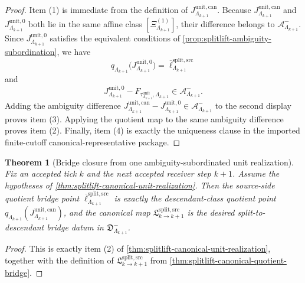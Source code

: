 \documentclass[11pt]{article}
\theoremstyle{definition}
\theoremstyle{plain}
\newtheorem{theorem}[definition]{Theorem}
\theoremstyle{remark}
\newcommand{\1}{\mathbf 1}
\begin{document}
\begin{proof}
Item \textnormal{(1)} is immediate from the definition of
\(
J^{\mathrm{unit,can}}_{\Lambda_{k+1}}
\).
Because
\(
J^{\mathrm{unit,can}}_{\Lambda_{k+1}}
\)
and
\(
J^{\mathrm{unit},0}_{\Lambda_{k+1}}
\)
both lie in the same affine class
\(
[\Xi^{(1)}_{\Lambda_{k+1}}]
\),
their difference belongs to
\(
\mathcal A^-_{\Lambda_{k+1}}
\).
Since
\(
J^{\mathrm{unit},0}_{\Lambda_{k+1}}
\)
satisfies the equivalent conditions of \cref{prop:splitlift-ambiguity-subordination}, we have
\[
q_{\Lambda_{k+1}}
\!\bigl(
J^{\mathrm{unit},0}_{\Lambda_{k+1}}
\bigr)
=
\overline\ell^{\mathrm{split,src}}_{\Lambda_{k+1}}
\]
and
\[
J^{\mathrm{unit},0}_{\Lambda_{k+1}}
-
F_{\tau^{\mathrm{unit}}_{\Lambda_{k+1}},\Lambda_{k+1}}
\in
\mathcal A^-_{\Lambda_{k+1}}.
\]
Adding the ambiguity difference
\(
J^{\mathrm{unit,can}}_{\Lambda_{k+1}}
-J^{\mathrm{unit},0}_{\Lambda_{k+1}}
\in
\mathcal A^-_{\Lambda_{k+1}}
\)
to the second display proves item \textnormal{(3)}.
Applying the quotient map to the same ambiguity difference proves item \textnormal{(2)}.
Finally, item \textnormal{(4)} is exactly the uniqueness clause in the imported finite-cutoff
canonical-representative package.
\end{proof}

\begin{theorem}[Bridge closure from one ambiguity-subordinated unit realization]
\label{thm:splitlift-canonical-bridge-from-B}
Fix an accepted tick \(k\) and the next accepted receiver step \(k+1\).
Assume the hypotheses of \cref{thm:splitlift-canonical-unit-realization}.
Then the source-side quotient bridge point
\(
\overline\ell^{\mathrm{split,src}}_{\Lambda_{k+1}}
\)
is exactly the descendant-class quotient point
\(
q_{\Lambda_{k+1}}(J^{\mathrm{unit,can}}_{\Lambda_{k+1}})
\),
and the canonical map
\(
\mathfrak L^{\mathrm{split,src}}_{k\to k+1}
\)
is the desired split-to-descendant bridge datum in
\(
\mathfrak D^-_{\Lambda_{k+1}}
\).
\end{theorem}

\begin{proof}
This is exactly item \textnormal{(2)} of
\cref{thm:splitlift-canonical-unit-realization}, together with the definition of
\(
\mathfrak L^{\mathrm{split,src}}_{k\to k+1}
\)
from \cref{thm:splitlift-canonical-quotient-bridge}.
\end{proof}
\end{document}

